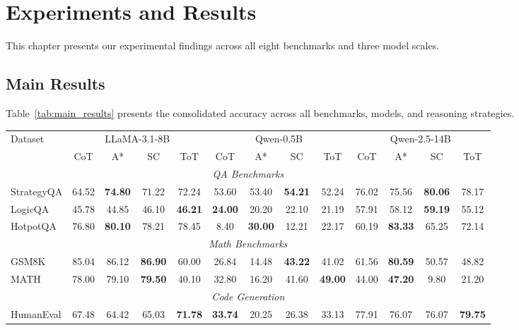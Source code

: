 \chapter{Experiments and Results}

This chapter presents our experimental findings across all eight benchmarks and three model scales.

\section{Main Results}

Table~\ref{tab:main_results} presents the consolidated accuracy across all benchmarks, models, and reasoning strategies.

\begin{table}[ht]
\centering
\small
\setlength{\tabcolsep}{2.5pt}
\begin{tabular}{lcccc|cccc|cccc}
\toprule
\multirow{2}{*}{Dataset}
& \multicolumn{4}{c}{LLaMA-3.1-8B}
& \multicolumn{4}{c}{Qwen-0.5B}
& \multicolumn{4}{c}{Qwen-2.5-14B} \\
\cmidrule(lr){2-5} \cmidrule(lr){6-9} \cmidrule(lr){10-13}
& CoT & A* & SC & ToT & CoT & A* & SC & ToT & CoT & A* & SC & ToT \\
\midrule
\multicolumn{13}{c}{\textit{QA Benchmarks}} \\
\midrule
StrategyQA & 64.52 & \textbf{74.80} & 71.22 & 72.24 & 53.60 & 53.40 & \textbf{54.21} & 52.24 & 76.02 & 75.56 & \textbf{80.06} & 78.17 \\
LogicQA & 45.78 & 44.85 & 46.10 & \textbf{46.21} & \textbf{24.00} & 20.20 & 22.10 & 21.19 & 57.91 & 58.12 & \textbf{59.19} & 55.12 \\
HotpotQA & 76.80 & \textbf{80.10} & 78.21 & 78.45 & 8.40 & \textbf{30.00} & 12.21 & 22.17 & 60.19 & \textbf{83.33} & 65.25 & 72.14 \\
\midrule
\multicolumn{13}{c}{\textit{Math Benchmarks}} \\
\midrule
GSM8K & 85.04 & 86.12 & \textbf{86.90} & 60.00 & 26.84 & 14.48 & \textbf{43.22} & 41.02 & 61.56 & \textbf{80.59} & 50.57 & 48.82 \\
MATH & 78.00 & 79.10 & \textbf{79.50} & 40.10 & 32.80 & 16.20 & 41.60 & \textbf{49.00} & 44.00 & \textbf{47.20} & 9.80 & 21.20 \\
\midrule
\multicolumn{13}{c}{\textit{Code Generation}} \\
\midrule
HumanEval & 67.48 & 64.42 & 65.03 & \textbf{71.78} & \textbf{33.74} & 20.25 & 26.38 & 33.13 & 77.91 & 76.07 & 76.07 & \textbf{79.75} \\

\end{tabular}
\end{table}
